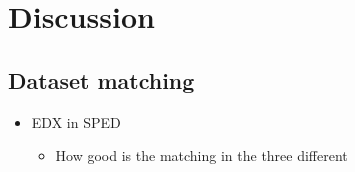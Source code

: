 \chapter{Discussion}

\section{Dataset matching}

\begin{itemize}
	\item EDX in SPED
	\begin{itemize}
		\item How good is the matching in the three different 
	\end{itemize}
\end{itemize}